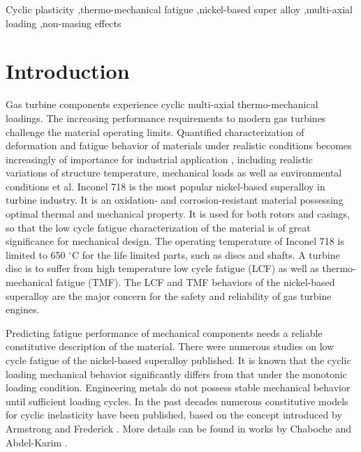 \documentclass[preprint,5p,twocolumn,11pt,sort&compress]{elsarticle}
\begin{document}
\begin{frontmatter}
%
\begin{keyword}
Cyclic plasticity \sep thermo-mechanical fatigue  \sep nickel-based super alloy  \sep multi-axial loading \sep non-masing effects
\end{keyword}
\end{frontmatter}

\section{Introduction}
\noindent Gas turbine components experience cyclic multi-axial thermo-mechanical loadings. The increasing performance requirements to modern gas turbines challenge  the material operating limits. Quantified characterization of deformation and fatigue behavior of materials under realistic conditions becomes increasingly of importance for industrial application \cite{harrison1996modelling}, including realistic variations of structure temperature, mechanical loads as well as environmental conditions et al. Inconel 718 is the most popular nickel-based superalloy in turbine industry. It is an oxidation- and corrosion-resistant material possessing optimal thermal and mechanical property. It is used for both rotors and casings, so that the low cycle fatigue characterization of the material is of great significance for mechanical design. The operating temperature of Inconel 718 is limited to 650 $^{\circ}$C for the life limited parts, such as discs and shafts. 
A turbine disc is to suffer from high temperature low cycle fatigue (LCF) as well as thermo-mechanical fatigue (TMF).
The LCF and TMF behaviors of the nickel-based superalloy are the major concern for the safety and reliability of gas turbine engines.

Predicting fatigue performance of mechanical components needs a reliable constitutive description of the material.  There were numerous studies on low cycle fatigue of the nickel-based superalloy published.
It is known that the cyclic loading mechanical behavior significantly differs from that under the monotonic loading condition. Engineering metals do not possess stable mechanical behavior until sufficient loading cycles. In the past decades numerous constitutive models for cyclic inelasticity \cite{ohno1993kinematic, Pun2014138, AbdelKarim2000225, Kang2004299} have been published, based on the concept introduced by Armstrong and Frederick \cite{armstrong1966mathematical}. More details can be found in works by Chaboche  \cite{Chaboche20081642} and Abdel-Karim  \cite{AbdelKarim2010711}.
\end{document}
